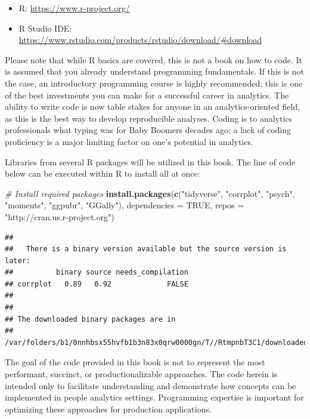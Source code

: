 \documentclass[]{book}
\newenvironment{Shaded}{\begin{snugshade}}{\end{snugshade}}
\newcommand{\CommentTok}[1]{\textcolor[rgb]{0.56,0.35,0.01}{\textit{#1}}}
\newcommand{\DataTypeTok}[1]{\textcolor[rgb]{0.13,0.29,0.53}{#1}}
\newcommand{\KeywordTok}[1]{\textcolor[rgb]{0.13,0.29,0.53}{\textbf{#1}}}
\newcommand{\NormalTok}[1]{#1}
\newcommand{\OtherTok}[1]{\textcolor[rgb]{0.56,0.35,0.01}{#1}}
\newcommand{\StringTok}[1]{\textcolor[rgb]{0.31,0.60,0.02}{#1}}
\providecommand{\tightlist}{%
  \setlength{\itemsep}{0pt}\setlength{\parskip}{0pt}}
\begin{document}
\begin{itemize}
\tightlist
\item
  R: \url{https://www.r-project.org/}
\item
  R Studio IDE: \url{https://www.rstudio.com/products/rstudio/download/\#download}
\end{itemize}

Please note that while R basics are covered, this is not a book on how to code. It is assumed that you already understand programming fundamentals. If this is not the case, an introductory programming course is highly recommended; this is one of the best investments you can make for a successful career in analytics. The ability to write code is now table stakes for anyone in an analytics-oriented field, as this is the best way to develop reproducible analyses. Coding is to analytics professionals what typing was for Baby Boomers decades ago; a lack of coding proficiency is a major limiting factor on one's potential in analytics.

Libraries from several R packages will be utilized in this book. The line of code below can be executed within R to install all at once:

\begin{Shaded}
\begin{Highlighting}[]
\CommentTok{# Install required packages}
\KeywordTok{install.packages}\NormalTok{(}\KeywordTok{c}\NormalTok{(}\StringTok{"tidyverse"}\NormalTok{, }\StringTok{"corrplot"}\NormalTok{, }\StringTok{"psych"}\NormalTok{, }\StringTok{"moments"}\NormalTok{, }\StringTok{"ggpubr"}\NormalTok{, }\StringTok{"GGally"}\NormalTok{), }\DataTypeTok{dependencies =} \OtherTok{TRUE}\NormalTok{, }\DataTypeTok{repos =} \StringTok{"http://cran.us.r-project.org"}\NormalTok{)}
\end{Highlighting}
\end{Shaded}

\begin{verbatim}
## 
##   There is a binary version available but the source version is later:
##          binary source needs_compilation
## corrplot   0.89   0.92             FALSE
## 
## 
## The downloaded binary packages are in
##  /var/folders/b1/0nnhbsx55hvfb1b3n83x0qrw0000gn/T//RtmpnbT3C1/downloaded_packages
\end{verbatim}

The goal of the code provided in this book is not to represent the most performant, succinct, or productionalizable approaches. The code herein is intended only to facilitate understanding and demonstrate how concepts can be implemented in people analytics settings. Programming expertise is important for optimizing these approaches for production applications.
\end{document}
